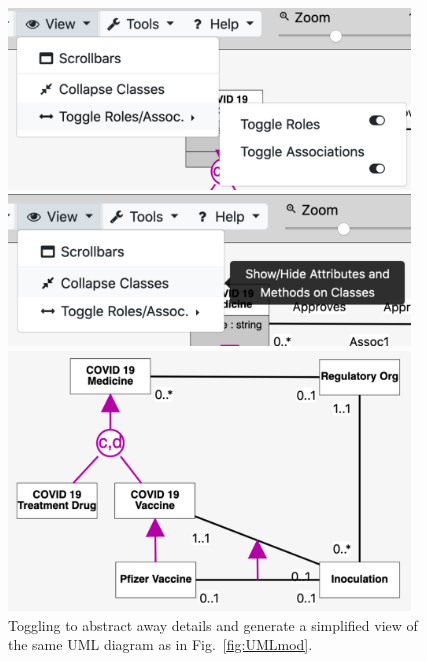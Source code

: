 \documentclass[sn-mathphys]{sn-jnl}
\begin{document}
\begin{figure}[h]
  \centering
      \includegraphics[width=0.95\textwidth]{toggleRR.pdf} 
            
      \vspace{1mm}
      
            \includegraphics[width=0.95\textwidth]{showhideAtt.pdf} 
            
                  \vspace{1mm}
      
            \includegraphics[width=0.95\textwidth]{UML3clean.pdf} 
    \caption{Toggling to abstract away details and generate a simplified view of the same UML diagram as in Fig.~\ref{fig:UMLmod}.}
    \label{fig:UMLabstract}
\end{figure}
\end{document}
